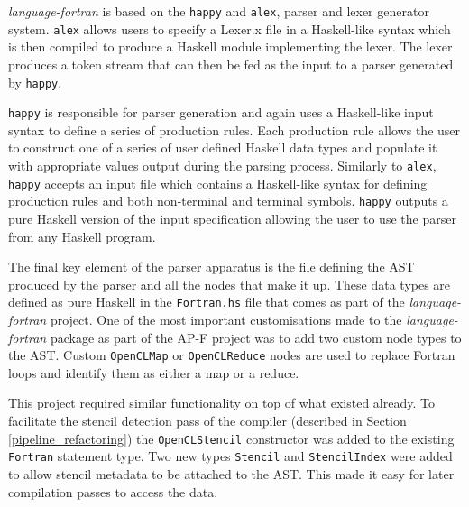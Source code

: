 \documentclass{mpaper}
\begin{document}
\textit{language-fortran} is based on the \texttt{happy} and \texttt{alex}, parser and lexer generator system.
\texttt{alex} allows users to specify a Lexer.x file in a Haskell-like syntax which is then compiled to produce a Haskell module implementing the lexer.
The lexer produces a token stream that can then be fed as the input to a parser generated by \texttt{happy}. 

\texttt{happy} is responsible for parser generation and again uses a Haskell-like input syntax to define a series of production rules. 
Each production rule allows the user to construct one of a series of user defined Haskell data types and populate it with appropriate values output during the parsing process.
Similarly to \texttt{alex}, \texttt{happy} accepts an input file which contains a Haskell-like syntax for defining production rules and both non-terminal and terminal symbols.
\texttt{happy} outputs a pure Haskell version of the input specification allowing the user to use the parser from any Haskell program. 

The final key element of the parser apparatus is the file defining the AST produced by the parser and all the nodes that make it up.
These data types are defined as pure Haskell in the \texttt{Fortran.hs} file that comes as part of the \textit{language-fortran} project.
One of the most important customisations made to the \textit{language-fortran} package as part of the AP-F project was to add two custom node types to the AST.
Custom \texttt{OpenCLMap} or \texttt{OpenCLReduce} nodes are used to replace Fortran loops and identify them as either a map or a reduce.

This project required similar functionality on top of what existed already.
To facilitate the stencil detection pass of the compiler (described in Section \ref{pipeline_refactoring}) the \texttt{OpenCLStencil} constructor was added to the existing \texttt{Fortran} statement type.
Two new types \texttt{Stencil} and \texttt{StencilIndex} were added to allow stencil metadata to be attached to the AST. 
This made it easy for later compilation passes to access the data.

\end{document}
